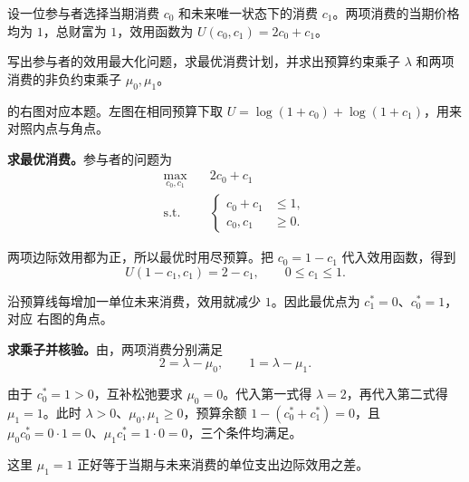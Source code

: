 \begin{tcolorbox}[example,title=课堂例题：角点消费与互补松弛]
\begin{question}
设一位参与者选择当期消费 $c_0$ 和未来唯一状态下的消费 $c_1$。两项消费的当期价格均为 $1$，总财富为 $1$，效用函数为 $U(c_0,c_1)=2c_0+c_1$。

写出参与者的效用最大化问题，求最优消费计划，并求出预算约束乘子 $\lambda$ 和两项消费的非负约束乘子 $\mu_0,\mu_1$。

 的右图对应本题。左图在相同预算下取 $U=\log(1+c_0)+\log(1+c_1)$，用来对照内点与角点。

\end{question}
\begin{solution}
\textbf{求最优消费。}参与者的问题为
\[
 \begin{aligned}
 \max_{c_0,c_1}\quad &2c_0+c_1\\
 \text{s.t.}\quad &
 \left\{\begin{aligned}
 c_0+c_1&\le1,\\
 c_0,c_1&\ge0.
 \end{aligned}\right.
 \end{aligned}
\]

两项边际效用都为正，所以最优时用尽预算。把 $c_0=1-c_1$ 代入效用函数，得到
\[
 U(1-c_1,c_1)=2-c_1,\qquad 0\le c_1\le1.
\]

沿预算线每增加一单位未来消费，效用就减少 $1$。因此最优点为 $c_1^*=0$、$c_0^*=1$，对应 右图的角点。

\textbf{求乘子并核验。}由，两项消费分别满足
\[
 2=\lambda-\mu_0,\qquad 1=\lambda-\mu_1.
\]

由于 $c_0^*=1>0$，互补松弛要求 $\mu_0=0$。代入第一式得 $\lambda=2$，再代入第二式得 $\mu_1=1$。此时 $\lambda>0$、$\mu_0,\mu_1\ge0$，预算余额 $1-(c_0^*+c_1^*)=0$，且 $\mu_0 c_0^*=0\cdot1=0$、$\mu_1 c_1^*=1\cdot0=0$，三个条件均满足。

这里 $\mu_1=1$ 正好等于当期与未来消费的单位支出边际效用之差。
\end{solution}
\end{tcolorbox}

